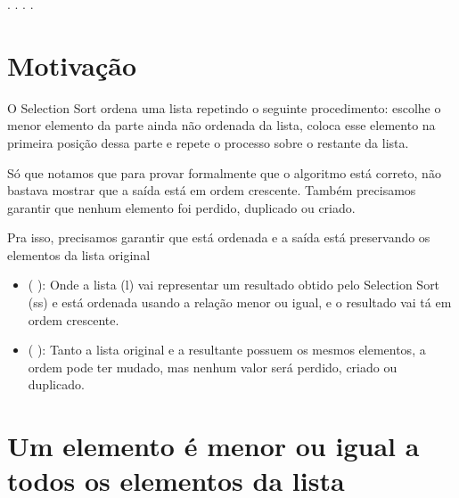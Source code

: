 \begin{coqdoccode}
\coqdocemptyline
\coqdocnoindent
{}    .\coqdoceol
\coqdocnoindent
{}  .\coqdoceol
\coqdocnoindent
{}  .\coqdoceol
\coqdocemptyline
\coqdocnoindent
{} .\coqdoceol
\coqdocemptyline
\end{coqdoccode}
\section{Motivação}




      O Selection Sort ordena uma lista repetindo o seguinte procedimento: escolhe o menor elemento 
    da parte ainda não ordenada da lista, coloca esse elemento na primeira posição dessa parte
     e repete o processo sobre o restante da lista.


    Só que notamos que para provar formalmente que o algoritmo está correto, não bastava mostrar
    que a saída está em ordem crescente. Também precisamos garantir que nenhum
    elemento foi perdido, duplicado ou criado.


    Pra isso, precisamos garantir que está ordenada e a saída está preservando os elementos da lista original



\begin{itemize}
\item  {}  ( ): Onde a lista (l) vai representar um resultado obtido pelo Selection Sort (ss) e  está ordenada usando a relação menor ou igual, e o resultado vai tá em ordem crescente.

\item  {}  ( ): Tanto a lista original e a resultante possuem os mesmos elementos, a ordem pode ter mudado, mas nenhum valor será perdido, criado ou duplicado.

\end{itemize}
    

\section{Um elemento é menor ou igual a todos os elementos da lista}




